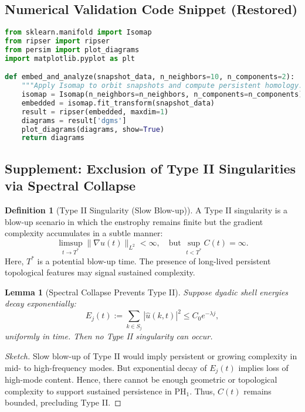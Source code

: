 \documentclass[11pt]{article}
\newtheorem{lemma}[theorem]{Lemma}
\theoremstyle{definition}
\newtheorem{definition}[theorem]{Definition}
\begin{document}
\subsection*{Numerical Validation Code Snippet (Restored)}

\begin{lstlisting}[language=Python, caption=Isomap + Persistent Homology Validation for Navier--Stokes Orbit Geometry]
from sklearn.manifold import Isomap
from ripser import ripser
from persim import plot_diagrams
import matplotlib.pyplot as plt

def embed_and_analyze(snapshot_data, n_neighbors=10, n_components=2):
    """Apply Isomap to orbit snapshots and compute persistent homology."""
    isomap = Isomap(n_neighbors=n_neighbors, n_components=n_components)
    embedded = isomap.fit_transform(snapshot_data)
    result = ripser(embedded, maxdim=1)
    diagrams = result['dgms']
    plot_diagrams(diagrams, show=True)
    return diagrams
\end{lstlisting}


\subsection*{Supplement: Exclusion of Type II Singularities via Spectral Collapse}

\begin{definition}[Type II Singularity (Slow Blow-up)]
A Type II singularity is a blow-up scenario in which the enstrophy remains finite but the gradient complexity accumulates in a subtle manner:
\[
\limsup_{t \to T^*} \|\nabla u(t)\|_{L^2} < \infty, \quad \text{but } \sup_{t<T^*} C(t) = \infty.
\]
Here, $T^*$ is a potential blow-up time. The presence of long-lived persistent topological features may signal sustained complexity.
\end{definition}

\begin{lemma}[Spectral Collapse Prevents Type II]
Suppose dyadic shell energies decay exponentially:
\[
E_j(t) := \sum_{k \in S_j} |\hat{u}(k,t)|^2 \leq C_0 e^{-\lambda j},
\]
uniformly in time. Then no Type II singularity can occur.
\end{lemma}

\begin{proof}[Sketch]
Slow blow-up of Type II would imply persistent or growing complexity in mid- to high-frequency modes. But exponential decay of $E_j(t)$ implies loss of high-mode content. Hence, there cannot be enough geometric or topological complexity to support sustained persistence in $\mathrm{PH}_1$. Thus, $C(t)$ remains bounded, precluding Type II.
\end{proof}
\end{document}
